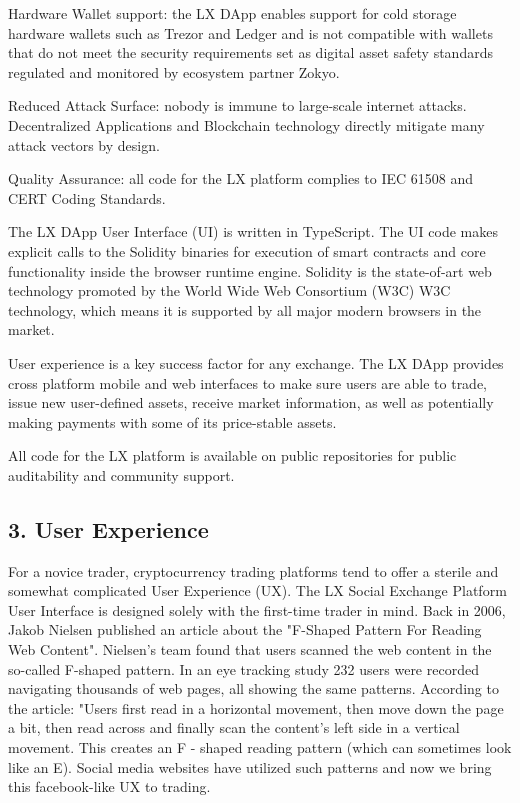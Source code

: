 \documentclass[11pt]{article}
\begin{document}
Hardware Wallet support: the LX DApp enables support for cold storage hardware wallets such as Trezor and Ledger and is not compatible with wallets that do not meet the security requirements set as digital asset safety standards regulated and monitored by ecosystem partner Zokyo.


Reduced Attack Surface: nobody is immune to large-scale internet attacks. Decentralized Applications and Blockchain technology directly mitigate many attack vectors by design.


Quality Assurance: all code for the LX platform complies to IEC 61508 and CERT Coding Standards.


The LX DApp User Interface (UI) is written in TypeScript. The UI code makes explicit calls to the Solidity binaries for execution of smart contracts and core functionality inside the browser runtime engine. Solidity is the state-of-art web technology promoted by the World Wide Web Consortium (W3C) W3C technology, which means it is supported by all major modern browsers in the market.


User experience is a key success factor for any exchange. The LX DApp provides cross platform mobile and web interfaces to make sure users are able to trade, issue new user-defined assets, receive market information, as well as potentially making payments with some of its price-stable assets.


All code for the LX platform is available on public repositories for public auditability and community support.


\subsection{3. User Experience}

For a novice trader, cryptocurrency trading platforms tend to offer a sterile and somewhat complicated User Experience (UX). The LX Social Exchange Platform User Interface is designed solely with the first-time trader in mind. Back in 2006, Jakob Nielsen published an article about the "F-Shaped Pattern For Reading Web Content". Nielsen's team found that users scanned the web content in the so-called F-shaped pattern. In an eye tracking study 232 users were recorded navigating thousands of web pages, all showing the same patterns. According to the article: "Users first read in a horizontal movement, then move down the page a bit, then read across and finally scan the content's left side in a vertical movement. This creates an F - shaped reading pattern (which can sometimes look like an E). Social media websites have utilized such patterns and now we bring this facebook-like UX to trading.
\end{document}
